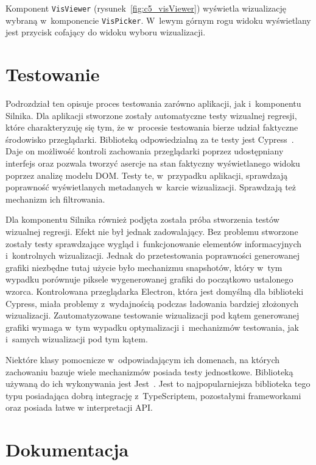 Komponent \texttt{VisViewer} (rysunek~\ref{fig:c5_visViewer}) wyświetla wizualizację wybraną w~komponencie \texttt{VisPicker}. W~lewym górnym rogu widoku wyświetlany jest przycisk cofający do widoku wyboru wizualizacji.

\section{Testowanie}

Podrozdział ten opisuje proces testowania zarówno aplikacji, jak i~komponentu Silnika. Dla aplikacji stworzone zostały automatyczne testy wizualnej regresji, które charakteryzuję się tym, że w~procesie testowania bierze udział faktyczne środowisko przeglądarki. Biblioteką odpowiedzialną za te testy jest Cypress~\cite{Cypress}. Daje on możliwość kontroli zachowania przeglądarki poprzez udostępniany interfejs oraz pozwala tworzyć asercje na stan faktyczny wyświetlanego widoku poprzez analizę modelu DOM. Testy te, w~przypadku aplikacji, sprawdzają poprawność wyświetlanych metadanych w~karcie wizualizacji. Sprawdzają też mechanizm ich filtrowania.

Dla komponentu Silnika również podjęta została próba stworzenia testów wizualnej regresji. Efekt nie był jednak zadowalający. Bez problemu stworzone zostały testy sprawdzające wygląd i~funkcjonowanie elementów informacyjnych i~kontrolnych wizualizacji. Jednak do przetestowania poprawności generowanej grafiki niezbędne tutaj użycie było mechanizmu snapshotów, który w~tym wypadku porównuje piksele wygenerowanej grafiki do początkowo ustalonego wzorca. Kontrolowana przeglądarka Electron, która jest domyślną dla biblioteki Cypress, miała problemy z~wydajnością podczas ładowania bardziej złożonych wizualizacji. Zautomatyzowane testowanie wizualizacji pod kątem generowanej grafiki wymaga w~tym wypadku optymalizacji i~mechanizmów testowania, jak i~samych wizualizacji pod tym kątem.

Niektóre klasy pomocnicze w~odpowiadającym ich domenach, na których zachowaniu bazuje wiele mechanizmów posiada testy jednostkowe. Biblioteką używaną do ich wykonywania jest Jest~\cite{Jest}. Jest to najpopularniejsza biblioteka tego typu posiadająca dobrą integrację z~TypeScriptem, pozostałymi frameworkami oraz posiada łatwe w interpretacji API.

\section{Dokumentacja}

